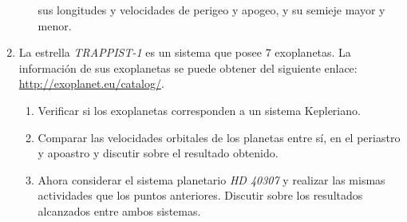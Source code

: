 \begin{enumerate}
\begin{enumerate}[a)]
	  sus longitudes y velocidades de perigeo y apogeo, y su semieje mayor
	  y menor.
      \end{enumerate}
    \item La estrella \emph{TRAPPIST-1} es un sistema que posee 7 exoplanetas.
      La información de sus exoplanetas se puede obtener del siguiente enlace:
      \href{http://exoplanet.eu/catalog/}{http://exoplanet.eu/catalog/}.
      \begin{enumerate}
	\item Verificar si los exoplanetas corresponden a un sistema Kepleriano.
	\item Comparar las velocidades orbitales de los planetas entre sí, en el
	  periastro y apoastro y discutir sobre el resultado obtenido.
	\item Ahora considerar el sistema planetario \emph{HD 40307} y realizar
	  las mismas actividades que los puntos anteriores. Discutir sobre los
	  resultados alcanzados entre ambos sistemas.
      \end{enumerate}

\end{enumerate}

